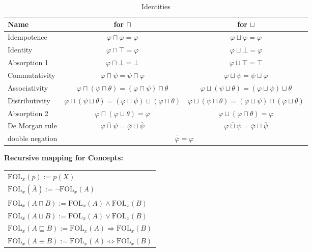 \begin{table}[h]
\centering
\caption{ Identities}
\label{tab:identities_pl0dl}
\begin{tabular}{|l|c|c|}
\hline
\textbf{Name} & \textbf{for $\sqcap$} & \textbf{for $\sqcup$} \\
\hline
Idempotence      & $\varphi \sqcap \varphi = \varphi$        & $\varphi \sqcup \varphi = \varphi$ \\
Identity         & $\varphi \sqcap \top = \varphi$            & $\varphi \sqcup \bot = \varphi$ \\
Absorption 1     & $\varphi \sqcap \bot = \bot$                & $\varphi \sqcup \top = \top$ \\
Commutativity    & $\varphi \sqcap \psi = \psi \sqcap \varphi$ & $\varphi \sqcup \psi = \psi \sqcup \varphi$ \\
Associativity    & $\varphi \sqcap (\psi \sqcap \theta) = (\varphi \sqcap \psi)\sqcap \theta$  
                 & $\varphi \sqcup (\psi \sqcup \theta) = (\varphi \sqcup \psi)\sqcup \theta$ \\
Distributivity   & $\varphi \sqcap (\psi \sqcup \theta)= (\varphi \sqcap \psi)\sqcup (\varphi \sqcap \theta)$ 
                 & $\varphi \sqcup (\psi \sqcap \theta)= (\varphi \sqcup \psi)\sqcap (\varphi \sqcup \theta)$ \\
Absorption 2     & $\varphi \sqcap (\varphi \sqcup \theta)= \varphi$ 
                 & $\varphi \sqcup (\varphi \sqcap \theta)= \varphi$ \\
De Morgan rule   & $\overline{\varphi \sqcap \psi}= \overline{\varphi} \sqcup \overline{\psi}$ 
                 & $\overline{\varphi \sqcup \psi} = \overline{\varphi} \sqcap \overline{\psi}$ \\
double negation  & \multicolumn{2}{c|}{$\overline{\overline{\varphi}}  = \varphi$} \\
\hline
\end{tabular}
\end{table}



\textbf{Recursive mapping for Concepts:}

\begin{tabular}{@{}l@{}}
    $\text{FOL}_x(p) := p(X)$ \\
    $\text{FOL}_x(\overline{A}) := \neg \text{FOL}_x(A)$ \\
    $\text{FOL}_x(A \sqcap B) := \text{FOL}_x(A) \land \text{FOL}_x(B)$ \\
    $\text{FOL}_x(A \sqcup B) := \text{FOL}_x(A) \lor \text{FOL}_x(B)$ \\
    $\text{FOL}_x(A \sqsubseteq B) := \text{FOL}_x(A) \Rightarrow \text{FOL}_x(B)$ \\
    $\text{FOL}_x(A \equiv B) := \text{FOL}_x(A) \Leftrightarrow \text{FOL}_x(B)$ \\
\end{tabular}

